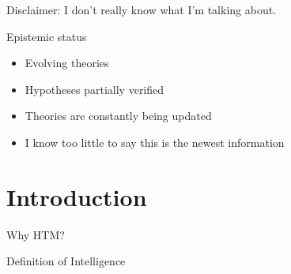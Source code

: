 
\begin{frame}[standout]
    Disclaimer: \pause I don't really know what I'm talking about.
\end{frame}

\begin{frame}[c]{Epistemic status}
    \Large
    \begin{itemize}[<+(1)->]
        \item Evolving theories
        \item Hypotheses partially verified
        \item Theories are constantly being updated
        \item I know too little to say this is the newest information
    \end{itemize}
\end{frame}

\section{Introduction}


\begin{frame}[c]{Why HTM?}
    
\end{frame}


\begin{frame}[c]{Definition of Intelligence}
    
\end{frame}


% 




%





